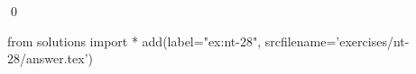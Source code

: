 
\begin{ex} 
  \label{ex:nt-28}
  
  \qed
\end{ex} 
\begin{python0}
from solutions import *
add(label="ex:nt-28",
    srcfilename='exercises/nt-28/answer.tex') 
\end{python0}
